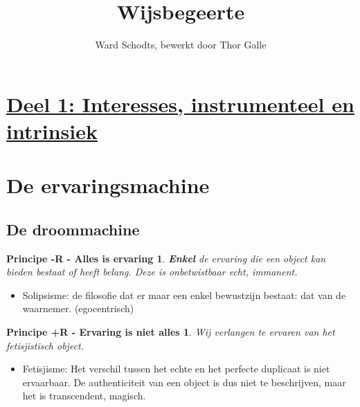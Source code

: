 \documentclass[11pt,a4paper]{article}
\begin{document}
\title{\huge Wijsbegeerte}
\author{Ward Schodts, bewerkt door Thor Galle}
\date{}
\maketitle


\section*{\centering \underline{Deel 1: Interesses, instrumenteel en intrinsiek}}

\section{De ervaringsmachine}
\subsection{De droommachine}
\newtheorem*{-R}{Principe -R - Alles is ervaring}
	\begin{-R}
	\newline \textbf{Enkel} de ervaring die een object kan bieden bestaat of heeft belang.
	\newline Deze is onbetwistbaar echt, immanent.
	\end{-R}
	\begin{itemize}
	\item Solipsisme: de filosofie dat er maar een enkel bewustzijn bestaat: dat van de waarnemer. (egocentrisch)
	\end{itemize}
\newtheorem*{+R}{Principe +R - Ervaring is niet alles}
	\begin{+R}
	Wij verlangen te ervaren van het fetisjistisch object.
	\end{+R}
	\begin{itemize}
	\item Fetisjisme: Het verschil tussen het echte en het perfecte duplicaat is niet ervaarbaar. De authenticiteit van een object is dus niet te beschrijven, maar het is transcendent, magisch.
	\end{itemize}
\end{document}
